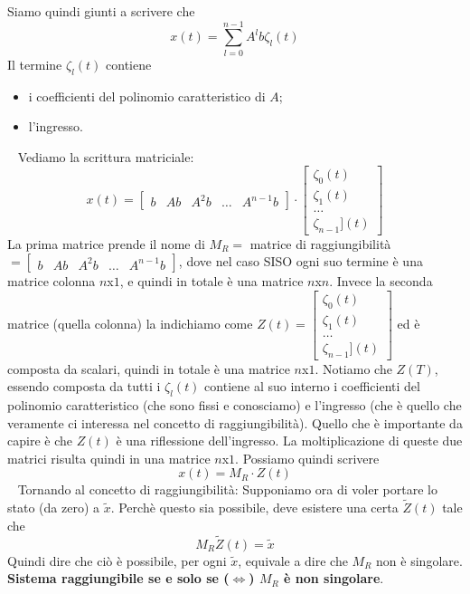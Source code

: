 \newline
Siamo quindi giunti a scrivere che
\[
    x(t) = \sum_{l=0}^{n-1} A^l b \zeta_l(t)
\]
Il termine $\zeta_l(t)$ contiene
\begin{itemize}
    \item i coefficienti del polinomio caratteristico di $A$;
    \item l'ingresso.
\end{itemize}
\ \newline
Vediamo la scrittura matriciale:
\[
    x(t) = \left[\begin{matrix}
        b & Ab & A^2 b & \dots & A^{n-1}b
    \end{matrix}\right] \cdot  \left[\begin{matrix}
        \zeta_0(t)\\
        \zeta_1(t)\\
        \dots\\
        \zeta_{n-1}](t)
    \end{matrix}\right]
\]
La prima matrice prende il nome di $M_R=$ matrice di raggiungibilità $=\left[\begin{matrix}
    b & Ab & A^2 b & \dots & A^{n-1}b
\end{matrix}\right] $, dove nel caso SISO ogni suo termine è una matrice colonna $n$x$1$, e quindi in totale è una matrice $n$x$n$.\newline
Invece la seconda matrice (quella colonna) la indichiamo come $Z(t) = \left[\begin{matrix}
    \zeta_0(t)\\
    \zeta_1(t)\\
    \dots\\
    \zeta_{n-1}](t)
\end{matrix}\right]$ ed è composta da scalari, quindi in totale è una matrice $n$x$1$. Notiamo che $Z(T)$, essendo composta da tutti i $\zeta_l(t)$ contiene al suo interno i coefficienti del polinomio caratteristico (che sono fissi e conosciamo) e l'ingresso (che è quello che veramente ci interessa nel concetto di raggiungibilità). Quello che è importante da capire è che $Z(t)$ è una riflessione dell'ingresso.\newline
La moltiplicazione di queste due matrici risulta quindi in una matrice $n$x$1$.\newline
Possiamo quindi scrivere 
\[
    x(t) = M_R \cdot Z(t)
\]
\ \newline
Tornando al concetto di raggiungibilità:\newline
Supponiamo ora di voler portare lo stato (da zero) a $\tilde{x}$. Perchè questo sia possibile, deve esistere una certa $\tilde{Z}(t)$ tale che 
\[
    M_R \tilde{Z}(t) = \tilde{x}
\]
Quindi dire che ciò è possibile, per ogni $\tilde{x}$, equivale a dire che $M_R$ non è singolare.\newline
\newline
\textbf{Sistema raggiungibile se e solo se ($\Leftrightarrow$) $M_R$ è non singolare}.

